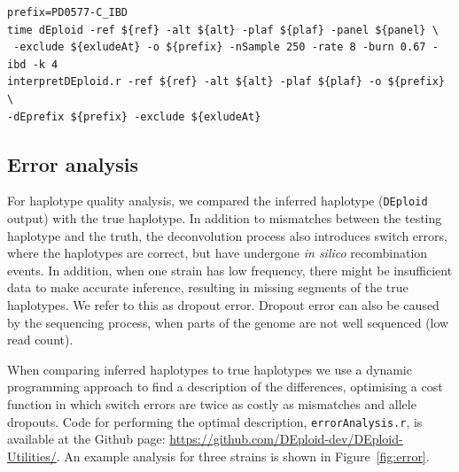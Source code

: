 \documentclass[9pt,lineno]{elife}
\begin{document}
\begin{appendixbox}
\begin{lstlisting}
prefix=PD0577-C_IBD
time dEploid -ref ${ref} -alt ${alt} -plaf ${plaf} -panel ${panel} \
 -exclude ${exludeAt} -o ${prefix} -nSample 250 -rate 8 -burn 0.67 -ibd -k 4
interpretDEploid.r -ref ${ref} -alt ${alt} -plaf ${plaf} -o ${prefix} \
-dEprefix ${prefix} -exclude ${exludeAt}
\end{lstlisting}


\subsection{Error analysis}

For haplotype quality analysis, we compared the inferred haplotype ({\tt DEploid} output) with the true haplotype. In addition to mismatches between the testing haplotype and the truth, the deconvolution process also introduces switch errors, where the haplotypes are correct, but have undergone {\it in silico} recombination events. In addition, when one strain has low frequency, there might be insufficient data to make accurate inference, resulting in missing segments of the true haplotypes. We refer to this as dropout error. Dropout error can also be caused by the sequencing process, when parts of the genome are not well sequenced (low read count).

When comparing inferred haplotypes to true haplotypes we use a dynamic programming approach to find a description of the differences, optimising a cost function in which switch errors are twice as costly as mismatches and allele dropouts.  Code for performing the optimal description, {\tt errorAnalysis.r}, is available at the Github page:  \url{https://github.com/DEploid-dev/DEploid-Utilities/}.  An example analysis for three strains is shown in Figure~\ref{fig:error}.

\end{appendixbox}
\end{document}
